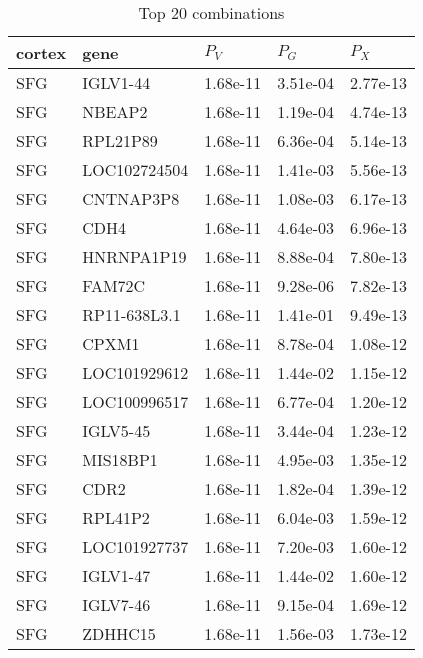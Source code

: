 \begin{table}[ht]
\centering
\begin{tabular}{lllll}
  \hline
  cortex & gene & $P_V$ & $P_G$ & $P_X$ \\ 
  \hline
  SFG & IGLV1-44 & 1.68e-11 & 3.51e-04 & 2.77e-13 \\ 
  SFG & NBEAP2 & 1.68e-11 & 1.19e-04 & 4.74e-13 \\ 
  SFG & RPL21P89 & 1.68e-11 & 6.36e-04 & 5.14e-13 \\ 
  SFG & LOC102724504 & 1.68e-11 & 1.41e-03 & 5.56e-13 \\ 
  SFG & CNTNAP3P8 & 1.68e-11 & 1.08e-03 & 6.17e-13 \\ 
  SFG & CDH4 & 1.68e-11 & 4.64e-03 & 6.96e-13 \\ 
  SFG & HNRNPA1P19 & 1.68e-11 & 8.88e-04 & 7.80e-13 \\ 
  SFG & FAM72C & 1.68e-11 & 9.28e-06 & 7.82e-13 \\ 
  SFG & RP11-638L3.1 & 1.68e-11 & 1.41e-01 & 9.49e-13 \\ 
  SFG & CPXM1 & 1.68e-11 & 8.78e-04 & 1.08e-12 \\ 
  SFG & LOC101929612 & 1.68e-11 & 1.44e-02 & 1.15e-12 \\ 
  SFG & LOC100996517 & 1.68e-11 & 6.77e-04 & 1.20e-12 \\ 
  SFG & IGLV5-45 & 1.68e-11 & 3.44e-04 & 1.23e-12 \\ 
  SFG & MIS18BP1 & 1.68e-11 & 4.95e-03 & 1.35e-12 \\ 
  SFG & CDR2 & 1.68e-11 & 1.82e-04 & 1.39e-12 \\ 
  SFG & RPL41P2 & 1.68e-11 & 6.04e-03 & 1.59e-12 \\ 
  SFG & LOC101927737 & 1.68e-11 & 7.20e-03 & 1.60e-12 \\ 
  SFG & IGLV1-47 & 1.68e-11 & 1.44e-02 & 1.60e-12 \\ 
  SFG & IGLV7-46 & 1.68e-11 & 9.15e-04 & 1.69e-12 \\ 
  SFG & ZDHHC15 & 1.68e-11 & 1.56e-03 & 1.73e-12 \\ 
   \hline
\end{tabular}
\caption{Top 20 combinations} 
\label{tb:tp20}
\end{table}
